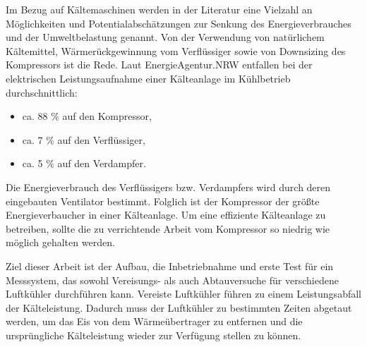 Im Bezug auf Kältemaschinen werden in der Literatur eine Vielzahl an Möglichkeiten und Potentialabschätzungen zur Senkung des Energieverbrauches und der Umweltbelastung genannt. Von der Verwendung von natürlichem Kältemittel, Wärmerückgewinnung vom Verflüssiger sowie von Downsizing des Kompressors ist die Rede. Laut EnergieAgentur.NRW \citep{EnergieAgenturNRW2010} entfallen bei der elektrischen Leistungsaufnahme einer Kälteanlage im Kühlbetrieb durchschnittlich:

\begin{itemize}
	\item ca. 88 $\%$ auf den Kompressor,
	\item ca. 7 $\%$ auf den Verflüssiger,
	\item ca. 5 $\%$ auf den Verdampfer.
\end{itemize}

Die Energieverbrauch des Verflüssigers bzw. Verdampfers wird durch deren eingebauten Ventilator bestimmt. 
Folglich ist der Kompressor der größte Energieverbaucher in einer Kälteanlage. Um eine effiziente Kälteanlage zu betreiben, sollte die zu verrichtende Arbeit vom Kompressor so niedrig wie möglich gehalten werden.

Ziel dieser Arbeit ist der Aufbau, die Inbetriebnahme und erste Test für ein Messsystem, das sowohl Vereisungs- als auch Abtauversuche für verschiedene Luftkühler durchführen kann. Vereiste Luftkühler führen zu einem Leistungsabfall der Kälteleistung. \cite{Grote2014}Dadurch muss der Luftkühler zu bestimmten Zeiten abgetaut werden, um das Eis von dem Wärmeübertrager zu entfernen und die ursprüngliche Kälteleistung wieder zur Verfügung stellen zu können. 



